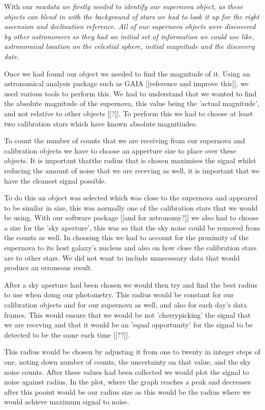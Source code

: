 \documentclass[twocolumn]{revtex4}
\begin{document}
With our \em{raw}\em data we firstly needed to identify our supernova object, as these objects can blend in with the background of stars we had to look it up for the right ascension and declination reference. All of our supernova objects were discovered by other astronomers so they had an initial set of information we could use like, astronomical location on the celestial sphere, initial magnitude and the discovery date.

Once we had found our object we needed to find the magnitude of it. Using an astronomical analysis package such as GAIA [[reference and improve this]], we used various tools to perform this. We had to understand that we wanted to find the absolute magnitude of the supernova, this value being the 'actual magnitude', and not relative to other objects [[?]]. To perform this we had to choose at least two calibration stars which have known absolute magnitiudes.

To count the number of counts that we are receiving from our supernova and calibration objects we have to choose an apperture size to place over these objects. It is important thatthe radius that is chosen maximises the signal whilst reducing the amount of noise that we are receving as well, it is important that we have the cleanest signal possible.

To do this an object was selected which was close to the supernova and appeared to be similar in size, this was normally one of the calibration stars that we would be using. With our software package [[and for astronomy?]] we also had to choose a size for the 'sky aperture', this was so that the sky noise could be removed from the counts as well. In choosing this we had to account for the proximity of the supernova to its host galaxy's nucleus and also on how close the calibration stars are to other stars. We did not want to include unnecessary data that would produce an erroneous result. 

After a sky aperture had been chosen we would then try and find the best radius to use when doing our photometry. This radius would be constant for our calibration objects and for our supernova as well, and also for each day's data frames. This would ensure that we would be not 'cherrypicking' the signal that we are receving and that it would be an 'equal opportunity' for the signal to be detected to be the same each time [[??]]. 

This radius would be chosen by adjusting it from one to twenty in integer steps of one, noting down number of counts, the uncertainty on that value, and the sky noise counts. After these values had been collected we would plot the signal to noise against radius. In the plot, where the graph reaches a peak and decreases after this pooint would be our radius size as this would be the radius where we would achieve maximum signal to noise.
\end{document}
